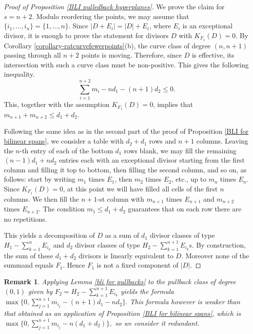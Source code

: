 \documentclass[a4paper,11pt]{article}
\newtheorem{remark}[theorem]{Remark}
\begin{document}
\begin{proof}[Proof of Proposition \ref{BLI pulledback hyperplanes}]
We prove the claim for $s=n+2$. Modulo reordering the points, we may assume that $\{i_1,\dots,i_n\}=\{1,\dots,n\}$. Since $|D+E_i|=|D|+E_i$, where $E_i$ is an exceptional divisor, it is enough to prove the statement for divisors $D$ with $K_{F_1}(D)=0$. 
By Corollary \ref{corollary-ratcurvefewerpoints}(b), the curve class of degree $(n,n+1)$ passing through all $n+2$ points is moving. Therefore, since $D$ is effective, its intersection with such a curve class must be non-positive. This gives the following inequality.
$$
\sum_{i=1}^{n+2}m_i- nd_1-(n+1)d_2\le0.
$$
This, together with the assumption $K_{F_1}(D)=0$, implies that $m_{n+1}+m_{n+2}\le d_1+d_2$.

Following the same idea as in the second part of the proof of Proposition \ref{BLI for bilinear spans}, we consider a table with $d_2+d_1$ rows and $n+1$ columns. Leaving the $n$-th entry of each of the bottom $d_1$ rows blank, we may fill  the remaining $(n-1)d_1+nd_2$ entries each with an exceptional divisor starting from the first column and filling it top to bottom, then filling the second column, and so on, as follows: start by writing  $m_1$ times $E_1$, then $m_2$ times $E_2$, etc., up to $m_{n}$ times $E_n$. Since $K_{F_1}(D)=0$, at this point we will have filled all cells of the first $n$ columns. We then fill the $n+1$-st column with $m_{n+1}$ times $E_{n+1}$ and $m_{n+2}$ times $E_{n+2}$. The condition $m_1\le d_1+d_2$ guarantees that  on each row there are no repetitions. 

This yields a decomposition of $D$ as a sum of $d_1$ divisor classes of type $H_1 -\sum_{k=1}^nE_{i_k}$ and $d_2$ divisor classes of type $H_2-\sum_{k=1}^{n+1}E_{i_k}$s. By construction, the sum  of these $d_1+d_2$ divisors is linearly equivalent to $D$. Moreover none of the summand equals $F_1$. Hence $F_1$ is not  a fixed component of $|D|$.
\end{proof}

\begin{remark}
Applying Lemma \ref{bli for pullbacks} to the pullback class of degree $(0,1)$ given by $F_2=H_2-\sum_{k=1}^{n+1}E_{i_k}$  yields the formula 
$\max\{0,\sum_{j=1}^{n+1} m_{i_j}-(n+1)d_1-nd_2\}.$
This formula however is weaker  than that obtained as an application of Proposition \ref{BLI for bilinear spans}, which is $\max\{0,\sum_{j=1}^{n+1} m_{i_j}-n(d_1+d_2)\},$
so we consider it redundant.
\end{remark}
\end{document}
